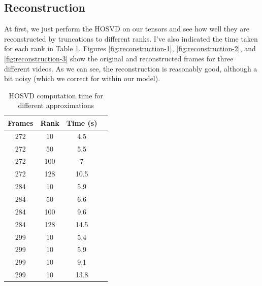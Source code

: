 \documentclass{article}
\begin{document}
\subsection{Reconstruction}
At first, we just perform the HOSVD on our tensors and see how well they are reconstructed by truncations to different ranks. I've also indicated the time taken for each rank in Table \ref{tab:reconstruction}. Figures \ref{fig:reconstruction-1}, \ref{fig:reconstruction-2}, and \ref{fig:reconstruction-3} show the original and reconstructed frames for three different videos. As we can see, the reconstruction is reasonably good, although a bit noisy (which we correct for within our model). 

\begin{table}
	\centering
	\begin{tabular}{|c|c|c|c|}
		\hline \textbf{Frames} & \textbf{Rank} & \textbf{Time (s)}\\
		\hline 272 & 10 & 4.5\\
		\hline 272 & 50 & 5.5\\
		\hline 272 & 100 & 7\\
		\hline 272 & 128 & 10.5\\
		\hline 284 & 10 & 5.9\\
		\hline 284 & 50 & 6.6\\
		\hline 284 & 100 & 9.6\\
		\hline 284 & 128 & 14.5\\
		\hline 299 & 10 & 5.4\\
		\hline 299 & 10 & 5.9\\
		\hline 299 & 10 & 9.1\\
		\hline 299 & 10 & 13.8\\
		\hline
	\end{tabular}
	\caption{HOSVD computation time for different approximations}
	\label{tab:reconstruction}
\end{table}
\end{document}
